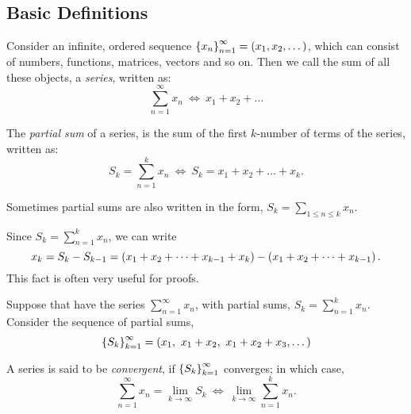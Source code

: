 \documentclass[12pt]{article}
\theoremstyle{definition}
\newcommand{\xn}{\set{x_{n}}_{n = 1}^{\infty}}
\newcommand{\ds}{\displaystyle}
\begin{document}
        \subsection{Basic Definitions}
            \begin{definition}[Series]
                Consider an infinite, ordered sequence $\xn = (x_{1}, x_{2}, \dots)$, which can consist of numbers, functions, matrices, vectors and so on. Then we call the sum of all these objects, a \textit{series}, written as: 
                \begin{equation*}
                    \sum_{n = 1}^{\infty}x_{n} ~ \Longleftrightarrow ~ x_{1} + x_{2} + \dots
                \end{equation*}
            \end{definition}
            \newpage
            \begin{definition}
                The \textit{partial sum} of a series, is the sum of the first $k$-number of terms of the series, written as:
                \begin{equation*}
                    S_{k} = \sum_{n = 1}^{k}x_{n} ~ \Longleftrightarrow ~ S_{k} = x_{1} + x_{2} + \dots + x_{k}.
                \end{equation*}
            \end{definition}
            \begin{note}
                Sometimes partial sums are also written in the form, $S_{k} = \ds\sum_{1 \leq n \leq k}x_{n}$.
            \end{note}
            \begin{remark}
                Since $S_{k} = \sum_{n = 1}^{k}x_{n}$, we can write
                \begin{equation*}
                    x_{k} = S_{k} - S_{k - 1} = \left(x_{1} + x_{2} + \dots + x_{k - 1} + x_{k}\right) - \left(x_{1} + x_{2} + \dots + x_{k - 1}\right).
                \end{equation*}
                This fact is often very useful for proofs.
            \end{remark}
            \begin{definition}
                Suppose that have the series $\sum_{n = 1}^{\infty}x_{n}$, with partial sums, $S_{k} = \sum_{n = 1}^{k}x_{n}$. Consider the sequence of partial sums, 
                \begin{equation*}
                    \left\{S_{k}\right\}_{k = 1}^{\infty} = (x_{1}, ~x_{1} + x_{2}, ~x_{1} + x_{2} + x_{3}, \dots)
                \end{equation*}

                A series is said to be \emph{convergent}, if $\left\{S_{k}\right\}_{k = 1}^{\infty}$ converges; in which case,
                \begin{equation*}
                    \sum_{n = 1}^{\infty}x_{n} = \lim_{k \rightarrow \infty}S_{k} ~ \Longleftrightarrow ~ \lim_{k \rightarrow \infty}\sum_{n = 1}^{k}x_{n}.
                \end{equation*}
            \end{definition}
\end{document}
